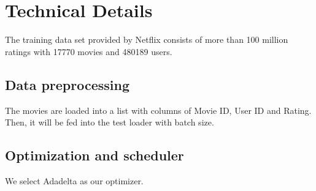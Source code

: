 \documentclass[final]{cvpr}
\begin{document}


\section{Technical Details}
The training data set provided by Netflix consists of more than 100 million ratings with 17770 movies and 480189 users.

\subsection{Data preprocessing}
The movies are loaded into a list with columns of Movie ID, User ID and Rating. Then, it will be fed into the test loader with batch size.





\subsection{Optimization and scheduler}
We select Adadelta as our optimizer. 
\end{document}
